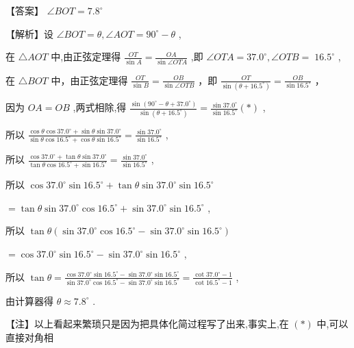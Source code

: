 \documentclass[10pt]{article}
\begin{document}
【答案】 \(\angle {BOT} = {7.8}^{ \circ  }\)

【解析】设 \(\angle {BOT} = \theta ,\angle {AOT} = {90}^{ \circ  } - \theta\) ,

在 \(\bigtriangleup {AOT}\) 中,由正弦定理得 \(\frac{OT}{\sin A} = \frac{OA}{\sin \angle {OTA}}\) ,即 \(\angle {OTA} = {37.0}^{ \circ  },\angle {OTB} = \; {16.5}^{ \circ  }\) ,

在 \(\bigtriangleup {BOT}\) 中，由正弦定理得 \(\frac{OT}{\sin B} = \frac{OB}{\sin \angle {OTB}}\) ，即 \(\frac{OT}{\sin \left( {\theta  + {16.5}^{ \circ  }}\right) } = \frac{OB}{\sin {16.5}^{ \circ  }}\) ，

因为 \({OA} = {OB}\) ,两式相除,得 \(\frac{\sin \left( {{90}^{ \circ  } - \theta  + {37.0}^{ \circ  }}\right) }{\sin \left( {\theta  + {16.5}^{ \circ  }}\right) } = \frac{\sin {37.0}^{ \circ  }}{\sin {16.5}^{ \circ  }}\left( *\right)\) ,

所以 \(\frac{\cos \theta \cos {37.0}^{ \circ  } + \sin \theta \sin {37.0}^{ \circ  }}{\sin \theta \cos {16.5}^{ \circ  } + \cos \theta \sin {16.5}^{ \circ  }} = \frac{\sin {37.0}^{ \circ  }}{\sin {16.5}^{ \circ  }}\) ,

所以 \(\frac{\cos {37.0}^{ \circ  } + \tan \theta \sin {37.0}^{ \circ  }}{\tan \theta \cos {16.5}^{ \circ  } + \sin {16.5}^{ \circ  }} = \frac{\sin {37.0}^{ \circ  }}{\sin {16.5}^{ \circ  }}\) ,

所以 \(\cos {37.0}^{ \circ  }\sin {16.5}^{ \circ  } + \tan \theta \sin {37.0}^{ \circ  }\sin {16.5}^{ \circ  }\)

\(= \tan \theta \sin {37.0}^{ \circ  }\cos {16.5}^{ \circ  } + \sin {37.0}^{ \circ  }\sin {16.5}^{ \circ  }\) ,

所以 \(\tan \theta \left( {\sin {37.0}^{ \circ  }\cos {16.5}^{ \circ  } - \sin {37.0}^{ \circ  }\sin {16.5}^{ \circ  }}\right)\)

\(= \cos {37.0}^{ \circ  }\sin {16.5}^{ \circ  } - \sin {37.0}^{ \circ  }\sin {16.5}^{ \circ  }\) ,

所以 \(\tan \theta  = \frac{\cos {37.0}^{ \circ  }\sin {16.5}^{ \circ  } - \sin {37.0}^{ \circ  }\sin {16.5}^{ \circ  }}{\sin {37.0}^{ \circ  }\cos {16.5}^{ \circ  } - \sin {37.0}^{ \circ  }\sin {16.5}^{ \circ  }} = \frac{\cot {37.0}^{ \circ  } - 1}{\cot {16.5}^{ \circ  } - 1}\) ,

由计算器得 \(\theta  \approx  {7.8}^{ \circ  }\) .

【注】以上看起来繁琐只是因为把具体化简过程写了出来,事实上,在 \(\left( *\right)\) 中,可以直接对角相
\end{document}
